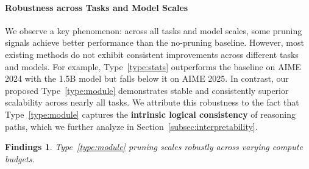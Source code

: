 \documentclass[11pt]{article}
\theoremstyle{plain}
\newtheorem{findings}{Findings}
\newcommand{\tx}[1]{[\textcolor{cyan}{tx: #1}]}
\begin{document}
\paragraph{Robustness across Tasks and Model Scales}
We observe a key phenomenon: across all tasks and model scales, some pruning signals achieve better performance than the no-pruning baseline.
However, most existing methods do not exhibit consistent improvements across different tasks and models.
For example, Type~\ref{type:stats} outperforms the baseline on AIME 2024 with the 1.5B model but falls below it on AIME 2025.
In contrast, our proposed Type~\ref{type:module} demonstrates stable and consistently superior scalability across nearly all tasks.
We attribute this robustness to the fact that Type~\ref{type:module} captures the \textbf{intrinsic logical consistency} of reasoning paths, which we further analyze in Section~\ref{subsec:interpretability}.


\begin{findings}\label{findings:XXX}
Type~\ref{type:module} pruning scales robustly across varying compute budgets.
\end{findings}



\end{document}
